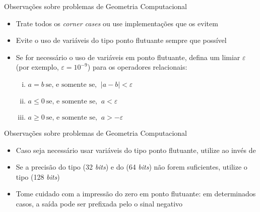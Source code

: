 \begin{frame}[fragile]{Observações sobre problemas de Geometria Computacional}

    \begin{itemize}
        \item Trate todos os \textit{corner cases} ou use implementações que os evitem
        \pause

        \item Evite o uso de variáveis do tipo ponto flutuante sempre que possível
        \pause

        \item Se for necessário o uso de variáveis em ponto flutuante, defina um limiar $\varepsilon$
        (por exemplo, $\varepsilon = 10^{-9}$) para os operadores relacionais:
        \pause


        \begin{enumerate}[i.]
            \item $a = b \ \mbox{se, e somente se, }\ |a - b| < \varepsilon$
        \pause
            \item $a \leq 0 \ \mbox{se, e somente se, }\ a < \varepsilon$
        \pause
            \item $a \geq 0 \ \mbox{se, e somente se, }\ a > -\varepsilon$
        \end{enumerate}
        \pause


    \end{itemize}

\end{frame}

\begin{frame}[fragile]{Observações sobre problemas de Geometria Computacional}

    \begin{itemize}
        \item Caso seja necessário usar variáveis do tipo ponto flutuante, utilize 
             ao invés de 
        \pause

        \item Se a precisão do tipo  (32 \textit{bits}) e do  
        (64 \textit{bits}) não forem suficientes, utilize o tipo 
        (128 \textit{bits})
        \pause

        \item Tome cuidado com a impressão do zero em ponto flutuante: em determinados casos, 
        a saída pode ser prefixada pelo o sinal negativo
        \pause

    \end{itemize}

\end{frame}

